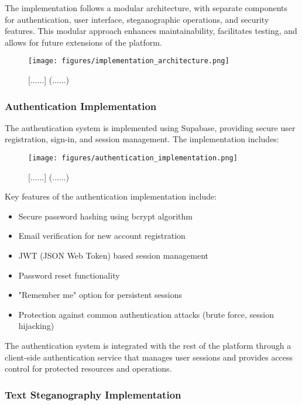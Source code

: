 \documentclass[12pt, a4paper, oneside]{book}
\begin{document}
The implementation follows a modular architecture, with separate components for authentication, user interface, steganographic operations, and security features. This modular approach enhances maintainability, facilitates testing, and allows for future extensions of the platform.

\begin{figure}[htbp]
    \centering
    \texttt{[image: figures/implementation\_architecture.png]}
    \caption{[......] (......)}
    \label{fig:implementation_architecture}
\end{figure}

\subsubsection{Authentication Implementation}

The authentication system is implemented using Supabase, providing secure user registration, sign-in, and session management. The implementation includes:

\begin{figure}[htbp]
    \centering
    \texttt{[image: figures/authentication\_implementation.png]}
    \caption{[......] (......)}
    \label{fig:authentication_implementation}
\end{figure}

Key features of the authentication implementation include:

\begin{itemize}[leftmargin=*]
    \item Secure password hashing using bcrypt algorithm
    \item Email verification for new account registration
    \item JWT (JSON Web Token) based session management
    \item Password reset functionality
    \item "Remember me" option for persistent sessions
    \item Protection against common authentication attacks (brute force, session hijacking)
\end{itemize}

The authentication system is integrated with the rest of the platform through a client-side authentication service that manages user sessions and provides access control for protected resources and operations.

\subsubsection{Text Steganography Implementation}
\end{document}
